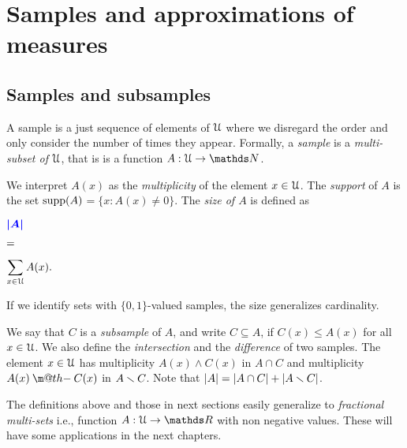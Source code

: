 \documentclass[sputnik.tex]{subfiles}
\begin{document}
\def\Fr{\mathop{\rm Fr}}

\def\vc{{\footnotesize VC}}
\def\nip{{\footnotesize NIP}}


\def\medrel#1{\parbox[t]{6ex}{$\displaystyle\hfil #1$}}
\def\ceq#1#2#3{\parbox[t]{25ex}{$\displaystyle #1$}\medrel{#2}{$\displaystyle #3$}}



\chapter{Samples and approximations of measures}


\section{Samples and subsamples}\label{multisets}

\def\ceq#1#2#3{\parbox[t]{32ex}{$\displaystyle #1$}\parbox{5ex}{$\displaystyle\hfil #2$}{$\displaystyle #3$}}

A sample is a just sequence of elements of $\EuScript U$ where we disregard the order and only consider the number of times they appear.
Formally, a \emph{sample\/} is a \emph{multi-subset of $\EuScript U$}, that is is a function $A:\U\to\NN$. 

We interpret $A(x)$ as the \emph{multiplicity\/} of the element $x\in\EuScript U$.
The \emph{support\/} of $A$ is the set \emph{$\mathop{\rm supp}(A)$}$=\{x:A(x)\neq0\}$.
The \emph{size of $A$\/} is defined as

\ceq{\hfill\emph{$|A|$}}{=}{\sum_{x\in\U} A(x).}

If we identify sets with $\{0,1\}$-valued samples, the size generalizes cardinality. 

\makeatletter
\def\dotminus{\mathbin{\ooalign{\hidewidth\raise1ex\hbox{.}\hidewidth\cr$\m@th-$\cr}}}
\makeatother

We say that $C$ is a \emph{subsample\/} of $A$, and write \emph{$C\subseteq A$}, if $C(x)\le A(x)$ for all $x\in\EuScript U$.
We also define the \emph{intersection\/} and the \emph{difference\/} of two samples.
The element $x\in\EuScript U$ has multiplicity  $A(x)\wedge C(x)$ in \emph{$A\cap C$\/} and multiplicity  $A(x)\dotminus C(x)$ in \emph{$A\smallsetminus C$}.
Note that $|A|=|A\cap C|+|A\smallsetminus C|$.


The definitions above and those in next sections easily generalize to \emph{fractional multi-sets\/} i.e., function $A:\U\to\RR$ with non negative values.
These will have some applications in the next chapters.
\end{document}
